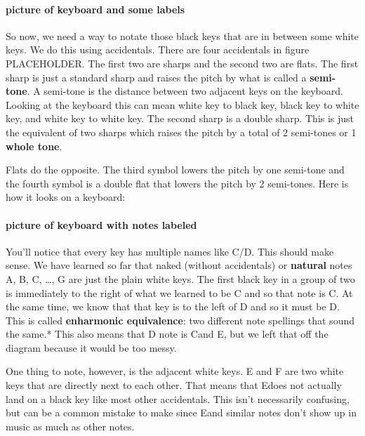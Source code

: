 \documentclass[../OpenAppliedMusicTheory.tex]{subfiles}
\begin{document}
        \paragraph{picture of keyboard and some labels}
        So now, we need a way to notate those black keys that are in between some white keys. We do this using accidentals. There are four accidentals in figure %
        PLACEHOLDER. The first two are sharps and the second two are flats. The first sharp is just a standard sharp and raises the pitch by what is called a \textbf{semi-tone}. A semi-tone is the distance between two adjacent keys on the keyboard. Looking at the keyboard this can mean white key to black key, black key to white key, and white key to white key. The second sharp is a double sharp. This is just the equivalent of two sharps which raises the pitch by a total of 2 semi-tones or 1 \textbf{whole tone}.

        Flats do the opposite. The third symbol lowers the pitch by one semi-tone and the fourth symbol is a double flat that lowers the pitch by 2 semi-tones. Here is how it looks on a keyboard:

        \paragraph{picture of keyboard with notes labeled}
        You'll notice that every key has multiple names like C\sh/D\fl. This should make sense. We have learned so far that naked (without accidentals) or \textbf{natural} notes A, B, C, \dots, G are just the plain white keys. The first black key in a group of two is immediately to the right of what we learned to be C and so that note is C\sh. At the same time, we know that that key is to the left of D and so it must be D\fl. This is called \textbf{enharmonic equivalence}: two different note spellings that sound the same.* %
        This also means that D note is C\musDoubleSharp and E\musDoubleFlat, but we left that off the diagram because it would be too messy. 

        One thing to note, however, is the adjacent white keys. E and F are two white keys that are directly next to each other. That means that E\sh does not actually land on a black key like most other accidentals. This isn't necessarily confusing, but can be a common mistake to make since E\sh and similar notes don't show up in music as much as other notes.
\end{document}

